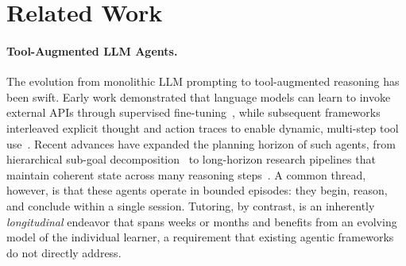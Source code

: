 \section{Related Work}
\label{sec:related}

\paragraph{Tool-Augmented LLM Agents.}
The evolution from monolithic LLM prompting to tool-augmented reasoning has been swift.
Early work demonstrated that language models can learn to invoke external APIs through supervised fine-tuning~\citep{schick2024toolformer}, while subsequent frameworks interleaved explicit thought and action traces to enable dynamic, multi-step tool use~\citep{yao2023reactsynergizingreasoningacting}.
Recent advances have expanded the planning horizon of such agents, from hierarchical sub-goal decomposition~\citep{zhao2025llmbasedagenticreasoningframeworks,wu-etal-2025-agentic,li2025intheflowagenticoptimizationeffective} to long-horizon research pipelines that maintain coherent state across many reasoning steps~\citep{chen2026iterresearch}.
A common thread, however, is that these agents operate in bounded episodes: they begin, reason, and conclude within a single session.
Tutoring, by contrast, is an inherently \emph{longitudinal} endeavor that spans weeks or months and benefits from an evolving model of the individual learner, a requirement that existing agentic frameworks do not directly address.

